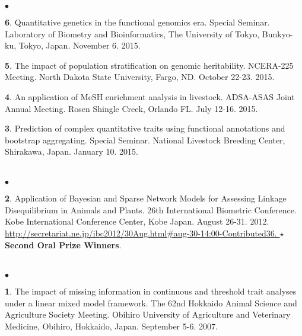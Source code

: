 \documentclass[margin,line,10pt]{res}
\newenvironment{list2}{
  \begin{list}{$\bullet$}{%
      \setlength{\itemsep}{0in}
      \setlength{\parsep}{0in} \setlength{\parskip}{0in}
      \setlength{\topsep}{0in} \setlength{\partopsep}{0in} 
      \setlength{\leftmargin}{0.2in}}}{\end{list}}
\begin{document}
\begin{resume}
\begin{list2}
  \vspace{0.5cm}

\item [{\bf 6}.] Quantitative genetics in the functional genomics era. Special Seminar. Laboratory of Biometry and Bioinformatics, The University of Tokyo, Bunkyo-ku, Tokyo, Japan. November 6. 2015.

  \vspace{0.5cm}
  
\item [{\bf 5}.] The impact of population stratification on genomic heritability. NCERA-225 Meeting. North Dakota State University, Fargo, ND. October 22-23. 2015.

  \vspace{0.5cm}

\item [{\bf 4}.] An application of MeSH enrichment analysis in livestock. ADSA-ASAS Joint Annual Meeting. Rosen Shingle Creek, Orlando FL. July 12-16. 2015.

  \vspace{0.5cm}
  
\item [{\bf 3}.] Prediction of complex quantitative traits using functional annotations and bootstrap aggregating. Special Seminar. National Livestock Breeding Center, Shirakawa, Japan. January 10. 2015.
\end{list2}  

\section{}
\begin{list2}
\item  [{\bf 2}.] Application of Bayesian and Sparse Network Models for Assessing Linkage Disequilibrium in Animals and Plants. 26th International Biometric Conference. Kobe International Conference Center, Kobe Japan. August 26-31. 2012. 
  \textcolor{blue}{\href{http://secretariat.ne.jp/ibc2012/30Aug.html\#aug-30-14:00-Contributed36}{http://secretariat.ne.jp/ibc2012/30Aug.html\#aug-30-14:00-Contributed36. } }   {\bf $\star$Second Oral Prize Winners}.
\end{list2}


\section{}
\begin{list2}
\item  [{\bf 1}.] The impact of missing information in continuous and threshold trait analyses under a linear mixed model framework. The 62nd Hokkaido Animal Science and Agriculture Society Meeting. Obihiro University of Agriculture and Veterinary Medicine, Obihiro, Hokkaido, Japan. September 5-6. 2007.
\end{list2}



\end{resume}
\end{document}
